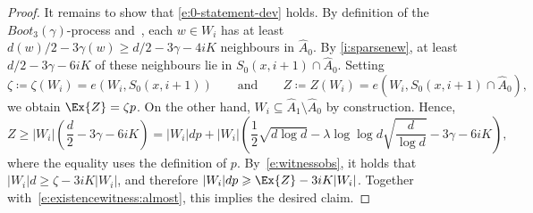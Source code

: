 \documentclass[reqno,a4paper,11pt]{amsart}
\theoremstyle{definition}
\renewcommand{\geq}{\geqslant}
\begin{document}
\begin{proof}
  It remains to show that \eqref{e:0-statement-dev} holds.
  By definition of the $Boot_3(\gamma)$-process and~, each $w \in W_i$ has at least $d(w)/2-3 \gamma(w) \geq d/2 - 3\gamma - 4iK$ neighbours in $\hat{A}_0$.
  By \ref{i:sparsenew}, at least $d/2-3 \gamma -6iK$ of these neighbours lie in $S_0(x, i+1) \cap \hat{A}_0$.
  Setting
  \[
    \zeta \coloneqq \zeta(W_i)= e(W_i, S_0(x, i+1)) \qquad \text{and} \qquad Z \coloneqq Z(W_i) = e(W_i, S_0(x, i+1) \cap \hat{A}_0),
  \]
  we obtain $\Ex{Z}= \zeta p$.
  On the other hand, $W_i \subseteq \hat{A}_1 \setminus \hat{A}_0$ by construction.
  Hence,
  \begin{equation}\label{e:existencewitness:almost}
    Z \geq |W_i|\left(\frac{d}{2}-3 \gamma - 6iK\right) = |W_i|dp + |W_i|\left(\frac{1}{2} \sqrt{d \log d} - \lambda \log \log d \sqrt{\frac{d}{\log d}} - 3 \gamma - 6iK \right),
  \end{equation}
  where the equality uses the definition of $p$.
  By~\eqref{e:witnessobs}, it holds that $|W_i|d \geq \zeta - 3iK|W_i|$, and therefore $|W_i|dp \geq \Ex{Z} - 3iK|W_i|$.
  Together with~\eqref{e:existencewitness:almost}, this implies the desired claim.
\end{proof}
\end{document}
